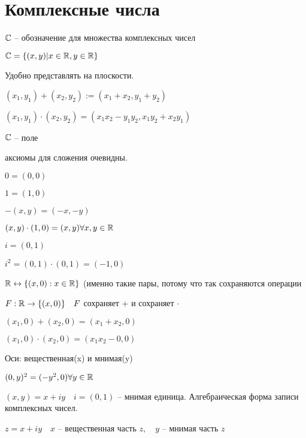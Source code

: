         \section{Комплексные числа}
        $\mathbb{C}$ -- обозначение для множества комплексных чисел

        $\mathbb{C} = \{(x,y)|x\in \mathbb{R}, y\in \mathbb{R}\}$

        Удобно представлять на плоскости.

        $(x_1,y_1) + (x_2,y_2) := (x_1+x_2,y_1+y_2)$

        $(x_1,y_1)\cdot (x_2,y_2) = (x_1x_2-y_1y_2,x_1y_2+x_2y_1) $
        \begin{note}
            $\mathbb{C}$ -- поле

            аксиомы для сложения очевидны.

            $0 = (0,0)$

            $1 = (1,0)$

            $-(x,y) = (-x,-y)$

            $(x,y) \cdot  (1,0) = (x,y) \forall x, y\in \mathbb{R}$

            $i = (0,1)$

            $i^2 = (0,1) \cdot  (0,1) = (-1,0)$
        \end{note}

        $\mathbb{R} \leftrightarrow \{(x,0) : x\in \mathbb{R}\}$ (именно такие пары, потому что так сохраняются операции

        $F: \mathbb{R} \to \{(x,0)\}\quad F$ сохраняет + и сохраняет $\cdot $ 

        $(x_1,0) + (x_2,0) = (x_1+x_2,0)$

        $(x_1, 0) \cdot  (x_2,0) = (x_1x_2-0,0)$



        Оси: вещественная(x) и мнимая(y)

        $(0,y)^2 = (-y^2,0) \forall y\in \mathbb{R}$

        $(x,y) = x+iy\quad i = (0,1)$ -- мнимая единица. Алгебраическая форма записи комплексных чисел.

        $z = x+iy\quad x$ -- вещественная часть $z,\quad y$ -- мнимая часть $z$

